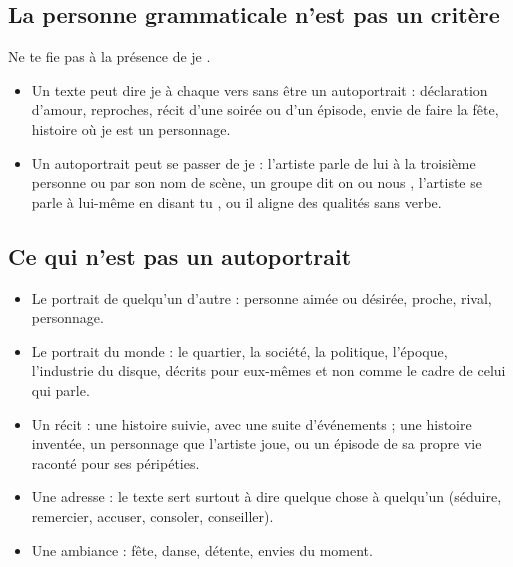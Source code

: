 \subsection*{La personne grammaticale n'est pas un critère}
Ne te fie pas à la présence de \og je \fg{}.
\begin{itemize}
\item Un texte peut dire \og je \fg{} à chaque vers sans être un autoportrait : déclaration d'amour, reproches, récit d'une soirée ou d'un épisode, envie de faire la fête, histoire où \og je \fg{} est un personnage.
\item Un autoportrait peut se passer de \og je \fg{} : l'artiste parle de lui à la troisième personne ou par son nom de scène, un groupe dit \og on \fg{} ou \og nous \fg{}, l'artiste se parle à lui-même en disant \og tu \fg{}, ou il aligne des qualités sans verbe.
\end{itemize}

\subsection*{Ce qui n'est pas un autoportrait}
\begin{itemize}
\item Le portrait de quelqu'un d'autre : personne aimée ou désirée, proche, rival, personnage.
\item Le portrait du monde : le quartier, la société, la politique, l'époque, l'industrie du disque, décrits pour eux-mêmes et non comme le cadre de celui qui parle.
\item Un récit : une histoire suivie, avec une suite d'événements ; une histoire inventée, un personnage que l'artiste joue, ou un épisode de sa propre vie raconté pour ses péripéties.
\item Une adresse : le texte sert surtout à dire quelque chose à quelqu'un (séduire, remercier, accuser, consoler, conseiller).
\item Une ambiance : fête, danse, détente, envies du moment.
\end{itemize}

